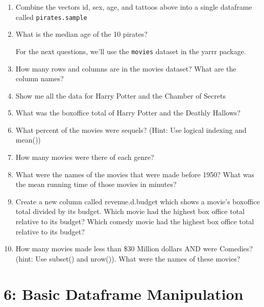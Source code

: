 \documentclass{tufte-book}\usepackage[]{graphicx}\usepackage[]{color}
\begin{document}
\begin{enumerate}

  \item Combine the vectors id, sex, age, and tattoos above into a single dataframe called \texttt{pirates.sample}
  
  \item What is the median age of the 10 pirates?
  
For the next questions, we'll use the \texttt{movies} dataset in the yarrr package.

  \item How many rows and columns are in the movies dataset? What are the column names?

  \item Show me all the data for Harry Potter and the Chamber of Secrets
  
  \item What was the boxoffice total of Harry Potter and the Deathly Hallows?
  
  \item What percent of the movies were sequels? (Hint: Use logical indexing and mean())
  
  \item How many movies were there of each genre?

  \item What were the names of the movies that were made before 1950? What was the mean running time of those movies in minutes?
  
  \item Create a new column called revenue.d.budget which shows a movie’s boxoffice total divided by its budget. Which movie had the highest box office total relative to its budget? Which comedy movie had the highest box office total relative to its budget?
  
  \item How many movies made less than \$30 Million dollars AND were Comedies? (hint: Use subset() and nrow()). What were the names of these movies?

\end{enumerate}




\chapter{6: Basic Dataframe Manipulation}
\label{ch:6}
\end{document}
